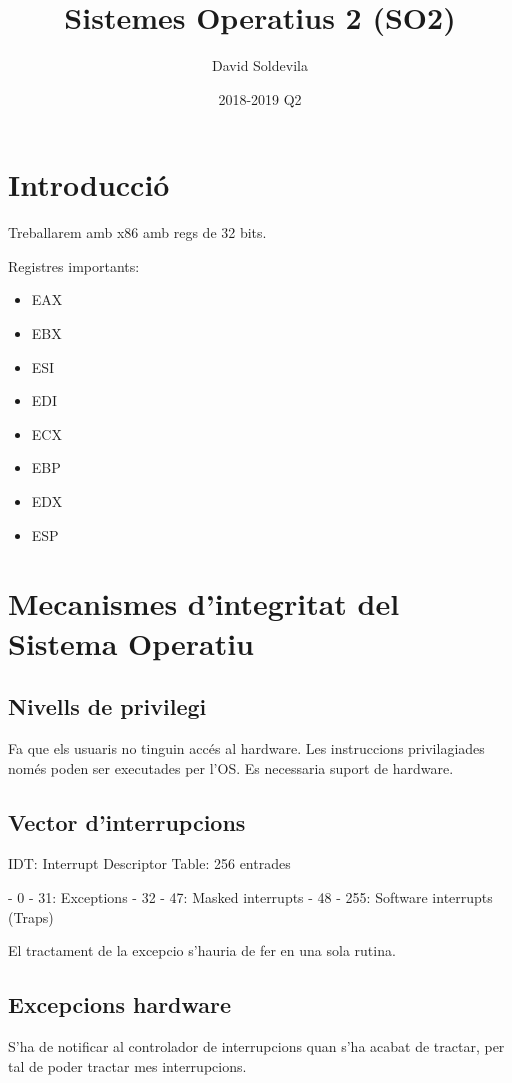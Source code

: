\documentclass{article}
\title{Sistemes Operatius 2 (SO2)}
\date{2018-2019 Q2}
\author{David Soldevila}
\begin{document}
    \maketitle  

    \pagebreak
    
    \tableofcontents
    
    \pagebreak

    \section{Introducció}

    Treballarem amb x86 amb regs de 32 bits.

    Registres importants:
    \begin{itemize}
        \item EAX
        \item EBX
        \item ESI
        \item EDI
        \item ECX
        \item EBP
        \item EDX     
        \item ESP
    \end{itemize}

    \pagebreak

    \section{Mecanismes d'integritat del Sistema Operatiu}

    \subsection{Nivells de privilegi}

    Fa que els usuaris no tinguin accés al hardware. Les instruccions privilagiades només poden ser executades per l'OS. Es necessaria suport de hardware.

    \subsection{Vector d'interrupcions}

    IDT: Interrupt Descriptor Table: 256 entrades

    - 0 - 31: Exceptions
    - 32 - 47: Masked interrupts
    - 48 - 255: Software interrupts (Traps)

    El tractament de la excepcio s'hauria de fer en una sola rutina.

    \subsection{Excepcions hardware}

    S'ha de notificar al controlador de interrupcions quan s'ha acabat de tractar, per tal de poder tractar mes interrupcions.
\end{document}
